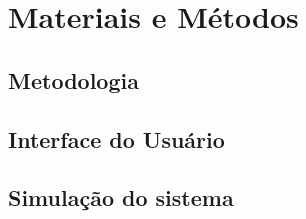 \chapter{Materiais e Métodos}
\label{chap:mat}
\lipsum[1]

\section{Metodologia}
\label{sec:met}
\lipsum[1]

\section{Interface do Usuário}
\label{sec:ui}
\lipsum[1]

\section{Simulação do sistema}
\label{sec:sim}
\lipsum[2-4]

